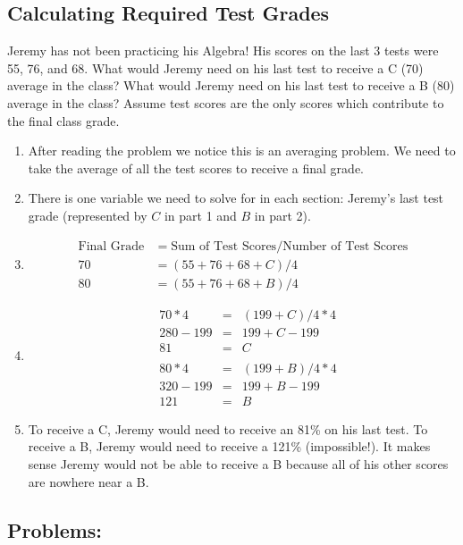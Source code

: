 \documentclass{book}
\theoremstyle{definition}
\begin{document}
\subsection{Calculating Required Test Grades}
\begin{addmargin}[2em]{2em}
Jeremy has not been practicing his Algebra! His scores on the last 3 tests were 55, 76, and 68. What would Jeremy need on his last test to receive a C (70) average in the class? What would Jeremy need on his last test to receive a B (80) average in the class? Assume test scores are the only scores which contribute to the final class grade.
\end{addmargin}
\begin{enumerate}
\item After reading the problem we notice this is an averaging problem. We need to take the average of all the test scores to receive a final grade.
\item There is one variable we need to solve for in each section: Jeremy’s last test grade (represented by $C$ in part 1 and $B$ in part 2).
\item \begin{align*} \text{Final Grade} &= \text{Sum of Test Scores} / \text{Number of Test Scores}\\
70 &= (55+76+68+C)/4 \\
80 &= (55+76+68+B)/4 
\end{align*}
\item \begin{align*}
    &70*4 &= &(199+C)/4 * 4 \\
    &280-199 &= &199+C-199 \\
    &81      &= &C \\ 
    \\
    &80*4 &= &(199+B)/4 * 4 \\
    &320-199 &= &199+B-199 \\
    &121      &= &B  
\end{align*}
\item To receive a C, Jeremy would need to receive an 81\% on his last test. To receive a B, Jeremy would need to receive a 121\% (impossible!). It makes sense Jeremy would not be able to receive a B because all of his other scores are nowhere near a B.
\end{enumerate}

\subsection{Problems:}
\end{document}
